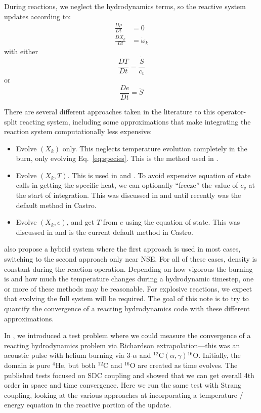\documentclass[times,preprint]{aastex63}
\newcommand{\castro}{{\sf Castro}}
\newcommand{\isotm}[2]{{}^{#2}\mathrm{#1}}
\newcommand{\omegadot}{\dot{\omega}}
\newcommand{\Sdot}{\dot{S}}
\begin{document}
During reactions, we neglect the hydrodynamics terms,
so the reactive system updates according to:
\begin{align}
\frac{D\rho}{Dt} &= 0 \\
\frac{DX_k}{Dt} &= \omegadot_k \label{eq:species}
\end{align}
with either
\begin{equation}
\frac{DT}{Dt} = \frac{\Sdot}{c_v}
\end{equation}
or
\begin{equation}
\frac{De}{Dt} = \Sdot
\end{equation}

There are several different approaches taken in the literature to
this operator-split reacting system, including some approximations
that make integrating the reaction system computationally less expensive:
\begin{itemize}
\item Evolve $(X_k)$ only.  This neglects temperature evolution
  completely in the burn, only evolving Eq.~\ref{eq:species}.  This is
  the method used in \citet{flash}.

\item Evolve $(X_k, T)$.   This is used in \cite{Pakmor:2012} and
  \cite{Garcia-Senz:2013}.  To avoid expensive equation of state calls
  in getting the specific heat, we can optionally ``freeze'' the value
  of $c_v$ at the start of integration.  This was discussed in \cite{Bell:2004} and
  until recently was the default method in \castro.

\item Evolve $(X_k, e)$, and get $T$ from $e$ using the equation of
  state.  This was discussed in \citet{fma} and is the current default
  method in \castro.
\end{itemize}
\cite{Raskin:2010} also propose a hybrid system where the first approach is
used in most cases, switching to the second approach only near NSE.
For all of these cases, density is constant during the reaction operation.
Depending on how vigorous the burning is and how much the temperature
changes during a hydrodynamic timestep, one or more of these
methods may be reasonable.  For explosive reactions, we expect
that evolving the full system will be required.  The goal of this
note is to try to quantify the convergence of a reacting hydrodynamics
code with these different approximations.

In \citet{castro_sdc}, we introduced a test problem where we could
measure the convergence of a reacting hydrodynamics problem via
Richardson extrapolation---this was an acoustic pulse with helium
burning via $3$-$\alpha$ and
$\isotm{C}{12}(\alpha,\gamma)\isotm{O}{16}$.  Initially, the domain is
pure $\isotm{He}{4}$, but both $\isotm{C}{12}$ and $\isotm{O}{16}$ are
created as time evolves.  The published tests focused on SDC coupling
and showed that we can get overall 4th order in space and time
convergence.  Here we run the same test with Strang coupling, looking
at the various approaches at incorporating a temperature / energy equation in
the reactive portion of the update.
\end{document}
